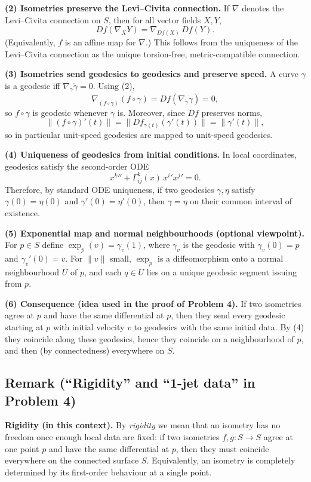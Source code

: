 \documentclass[12pt,a4paper]{article}
\theoremstyle{plain}
\theoremstyle{definition}      %
\begin{document}
\medskip
\textbf{(2) Isometries preserve the Levi--Civita connection.}
If $\nabla$ denotes the Levi--Civita connection on $S$, then for all vector fields $X,Y$,
\[
Df(\nabla_X Y)=\nabla_{Df(X)}\,Df(Y).
\]
(Equivalently, $f$ is an affine map for $\nabla$.) This follows from the uniqueness of the Levi--Civita
connection as the unique torsion-free, metric-compatible connection.

\medskip
\textbf{(3) Isometries send geodesics to geodesics and preserve speed.}
A curve $\gamma$ is a geodesic iff $\nabla_{\dot\gamma}\dot\gamma=0$.
Using (2),
\[
\nabla_{\dot{(f\circ\gamma)}}\dot{(f\circ\gamma)}
= Df(\nabla_{\dot\gamma}\dot\gamma)=0,
\]
so $f\circ\gamma$ is geodesic whenever $\gamma$ is. Moreover, since $Df$ preserves norms,
\[
\|(f\circ\gamma)'(t)\|=\|Df_{\gamma(t)}(\gamma'(t))\|=\|\gamma'(t)\|,
\]
so in particular unit-speed geodesics are mapped to unit-speed geodesics.

\medskip
\textbf{(4) Uniqueness of geodesics from initial conditions.}
In local coordinates, geodesics satisfy the second-order ODE
\[
x^{k}{}'' + \Gamma^k_{ij}(x)\,x^i{}'x^j{}' = 0.
\]
Therefore, by standard ODE uniqueness, if two geodesics $\gamma,\eta$ satisfy
$\gamma(0)=\eta(0)$ and $\gamma'(0)=\eta'(0)$, then $\gamma=\eta$ on their common interval of existence.

\medskip
\textbf{(5) Exponential map and normal neighbourhoods (optional viewpoint).}
For $p\in S$ define $\exp_p(v)=\gamma_v(1)$, where $\gamma_v$ is the geodesic with
$\gamma_v(0)=p$ and $\gamma_v'(0)=v$.
For $\|v\|$ small, $\exp_p$ is a diffeomorphism onto a normal neighbourhood $U$ of $p$,
and each $q\in U$ lies on a unique geodesic segment issuing from $p$.

\medskip
\textbf{(6) Consequence (idea used in the proof of Problem 4).}
If two isometries agree at $p$ and have the same differential at $p$, then they send every geodesic
starting at $p$ with initial velocity $v$ to geodesics with the same initial data.
By (4) they coincide along these geodesics, hence they coincide on a neighbourhood of $p$,
and then (by connectedness) everywhere on $S$.

\subsection*{Remark (``Rigidity'' and ``1-jet data'' in Problem 4)}

\textbf{Rigidity (in this context).}
By \emph{rigidity} we mean that an isometry has no freedom once enough local data are fixed:
if two isometries $f,g:S\to S$ agree at one point $p$ and have the same differential at $p$,
then they must coincide everywhere on the connected surface $S$.
Equivalently, an isometry is completely determined by its first-order behaviour at a single point.
\end{document}
